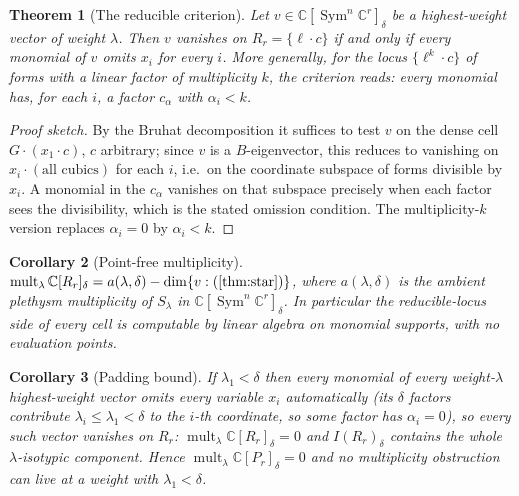 \documentclass[11pt]{amsart}
\theoremstyle{plain}
\newtheorem{theorem}{Theorem}[section]
\newtheorem{corollary}[theorem]{Corollary}
\theoremstyle{definition}
\theoremstyle{remark}
\DeclareMathOperator{\Sym}{Sym}
\DeclareMathOperator{\mult}{mult}
\newcommand{\bC}{\mathbb{C}}
\newcommand{\Rr}{R}
\newcommand{\Pp}{P}
\begin{document}
\begin{theorem}[The reducible criterion]\label{thm:star}
Let $v\in\bC[\Sym^{n}\bC^{r}]_\delta$ be a highest-weight vector of weight
$\lambda$.  Then $v$ vanishes on $\Rr_r=\{\ell\cdot c\}$ if and only if every
monomial of $v$ omits $x_i$ for every $i$.  More generally, for the locus
$\{\ell^{k}\cdot c\}$ of forms with a linear factor of multiplicity $k$, the
criterion reads: every monomial has, for each $i$, a factor $c_\alpha$ with
$\alpha_i<k$.
\end{theorem}

\begin{proof}[Proof sketch]
By the Bruhat decomposition it suffices to test $v$ on the dense cell
$G\cdot(x_1\cdot c)$, $c$ arbitrary; since $v$ is a $B$-eigenvector, this
reduces to vanishing on $x_i\cdot(\text{all cubics})$ for each $i$, i.e.\ on
the coordinate subspace of forms divisible by $x_i$.  A monomial in the
$c_\alpha$ vanishes on that subspace precisely when each factor sees the
divisibility, which is the stated omission condition.  The multiplicity-$k$
version replaces $\alpha_i=0$ by $\alpha_i<k$.
\end{proof}

\begin{corollary}[Point-free multiplicity]\label{cor:pointfree}
$\mult_\lambda\bC[\Rr_r]_\delta=a(\lambda,\delta)-\dim\{v:\text{(\ref{thm:star})}\}$,
where $a(\lambda,\delta)$ is the ambient plethysm multiplicity of $S_\lambda$
in $\bC[\Sym^{n}\bC^{r}]_\delta$.  In particular the reducible-locus side of
every cell is computable by linear algebra on monomial supports, with no
evaluation points.
\end{corollary}

\begin{corollary}[Padding bound]\label{cor:kl}
If $\lambda_1<\delta$ then every monomial of every weight-$\lambda$
highest-weight vector omits every variable $x_i$ automatically (its $\delta$
factors contribute $\lambda_i\le\lambda_1<\delta$ to the $i$-th coordinate, so
some factor has $\alpha_i=0$), so every such vector vanishes on $\Rr_r$:
$\mult_\lambda\bC[\Rr_r]_\delta=0$ and $I(\Rr_r)_\delta$ contains the whole
$\lambda$-isotypic component.  Hence $\mult_\lambda\bC[\Pp_r]_\delta=0$ and
\emph{no multiplicity obstruction can live at a weight with $\lambda_1<\delta$}.
\end{corollary}
\end{document}
